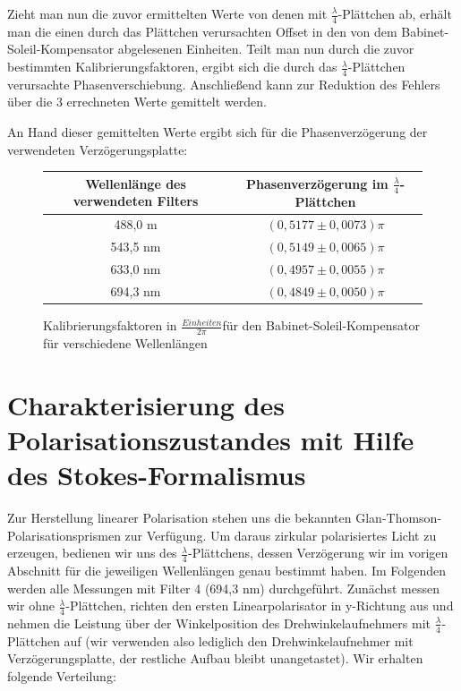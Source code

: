 \documentclass[bigchapter,colorback,accentcolor=tud4b,linedtoc,11pt]{tudreport}
\begin{document}
Zieht man nun die zuvor ermittelten Werte von denen mit $\frac{\lambda}{4}$-Plättchen ab, erhält man die einen durch das Plättchen verursachten Offset in den von dem Babinet-Soleil-Kompensator abgelesenen Einheiten. Teilt man nun durch die zuvor bestimmten Kalibrierungsfaktoren, ergibt sich die durch das $\frac{\lambda}{4}$-Plättchen verursachte Phasenverschiebung. Anschließend kann zur Reduktion des Fehlers über die 3 errechneten Werte gemittelt werden.

An Hand dieser gemittelten Werte ergibt sich für die Phasenverzögerung der verwendeten Verzögerungsplatte:

\begin{figure}[h]
  \begin{center}
    \begin{tabular}{|c|c|}
      \hline
          Wellenlänge des verwendeten Filters & Phasenverzögerung im $\frac{\lambda}{4}$-Plättchen \\ \hline
          488,0 m                              & $(0,5177 \pm 0,0073)\pi$                           \\ \hline
          543,5 nm                              & $(0,5149 \pm 0,0065)\pi$                           \\ \hline
          633,0 nm                              & $(0,4957 \pm 0,0055)\pi$                           \\ \hline
          694,3 nm                              & $(0,4849 \pm 0,0050)\pi$                           \\ \hline
    \end{tabular}
    \caption{Kalibrierungsfaktoren in $\frac{Einheiten}{2\pi}$für den Babinet-Soleil-Kompensator für verschiedene Wellenlängen}
  \end{center}
\end{figure}


\section{Charakterisierung des Polarisationszustandes mit Hilfe des Stokes-Formalismus}
Zur Herstellung linearer Polarisation stehen uns die bekannten Glan-Thomson-Polarisationsprismen zur Verfügung. Um daraus zirkular polarisiertes Licht zu erzeugen, bedienen wir uns des $\frac{\lambda}{4}$-Plättchens, dessen Verzögerung wir im vorigen Abschnitt für die jeweiligen Wellenlängen genau bestimmt haben. Im Folgenden werden alle Messungen mit Filter 4 (694,3 nm) durchgeführt. Zunächst messen wir ohne $\frac{\lambda}{4}$-Plättchen, richten den ersten Linearpolarisator in y-Richtung aus und nehmen die Leistung über der Winkelposition des Drehwinkelaufnehmers mit $\frac{\lambda}{4}$-Plättchen auf (wir verwenden also lediglich den Drehwinkelaufnehmer mit Verzögerungsplatte, der restliche Aufbau bleibt unangetastet). Wir erhalten folgende Verteilung:
\end{document}
